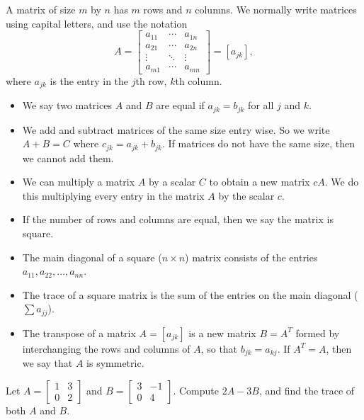 \begin{definition}
A matrix of size {$m$} by {$n$} has {$m$} rows and {$n$} columns.  We normally write matrices using capital letters, and use the notation 
$$A = 
\begin{bmatrix}
a_{11}&\cdots&a_{1n}\\ 
a_{21}&\cdots&a_{2n}\\ 
\vdots&\ddots&\vdots\\ 
a_{m1}&\cdots&a_{mn} 
\end{bmatrix} 
= [a_{jk}],$$
where $a_{jk}$ is the entry in the $j$th row, $k$th column. 
\begin{itemize}
 \item We say two matrices {$A$} and {$B$} are equal if {$a_{jk}=b_{jk}$} for all $j$ and $k$.
 \item We add and subtract matrices of the same size entry wise. So we write $A+B=C$ where $c_{jk} = a_{jk}+b_{jk}$. If matrices do not have the same size, then we cannot add them.
 \item We can multiply a matrix $A$ by a scalar $C$ to obtain a new matrix $cA$.  We do this multiplying every entry in the matrix $A$ by the scalar {$c$}.
 \item If the number of rows and columns are equal, then we say the matrix is square.  
 \item The main diagonal of a square ({$n \times n$}) matrix consists of the entries {$a_{11},a_{22},\ldots,a_{nn}$}. 
 \item The trace of a square matrix is the sum of the entries on the main diagonal ($\sum a_{jj}$). 
 \item The transpose of a matrix {$A=[a_{jk}]$} is a new matrix {$B=A^T$} formed by interchanging the rows and columns of $A$, so that $b_{jk}=a_{kj}$.  If $A^T=A$, then we say that $A$ is symmetric.
\end{itemize}
\end{definition}

\begin{problem}
Let $A=\begin{bmatrix}
1&3\\
0&2
\end{bmatrix}
$ and 
$B=
\begin{bmatrix}
3&-1\\
0&4
\end{bmatrix}
$.  
Compute $2A-3B$, and find the trace of both $A$ and $B$.  
\end{problem}


